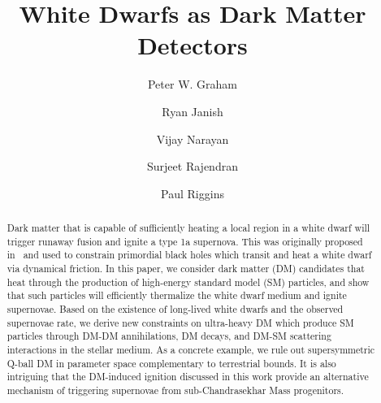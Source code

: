 \documentclass[preprintnumbers,amsmath,amssymb,prd,superscriptaddress]{revtex4}
\begin{document}

\title{White Dwarfs as Dark Matter Detectors}

\author{Peter W. Graham}

\author{Ryan Janish}

\author{Vijay Narayan}

\author{Surjeet Rajendran}

\author{Paul Riggins}

\begin{abstract}
Dark matter that is capable of sufficiently heating a local region in a white dwarf will trigger runaway fusion and ignite a type 1a supernova.
This was originally proposed in~\cite{Graham:2015apa} and used to constrain primordial black holes which transit and heat a white dwarf via dynamical friction.
In this paper, we consider dark matter (DM) candidates that heat through the production of high-energy standard model (SM) particles, and show that such particles will efficiently thermalize the white dwarf medium and ignite supernovae.
Based on the existence of long-lived white dwarfs and the observed supernovae rate, we derive new constraints on ultra-heavy DM which produce SM particles through DM-DM annihilations, DM decays, and DM-SM scattering interactions in the stellar medium. 
As a concrete example, we rule out supersymmetric Q-ball DM in parameter space complementary to terrestrial bounds.
It is also intriguing that the DM-induced ignition discussed in this work provide an alternative mechanism of triggering supernovae from sub-Chandrasekhar Mass progenitors.
\end{abstract}

\maketitle

\end{document}
